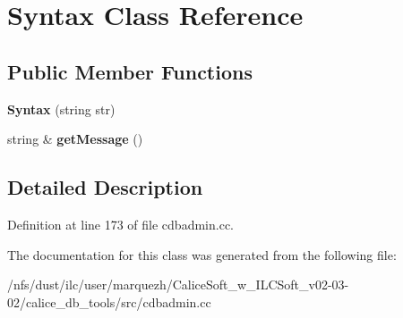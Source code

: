 \section{Syntax Class Reference}
\label{classSyntax}
\subsection*{Public Member Functions}
\begin{DoxyCompactItemize}
\item 
{\bfseries Syntax} (string str)\label{classSyntax_aa98349efaef7b45bbdcd10f495d734e2}

\item 
string \& {\bfseries get\-Message} ()\label{classSyntax_a971f81d4ddd5333cf22ab48334d9f74a}

\end{DoxyCompactItemize}


\subsection{Detailed Description}


Definition at line 173 of file cdbadmin.\-cc.



The documentation for this class was generated from the following file\-:\begin{DoxyCompactItemize}
\item 
/nfs/dust/ilc/user/marquezh/\-Calice\-Soft\-\_\-w\-\_\-\-I\-L\-C\-Soft\-\_\-v02-\/03-\/02/calice\-\_\-db\-\_\-tools/src/cdbadmin.\-cc\end{DoxyCompactItemize}
